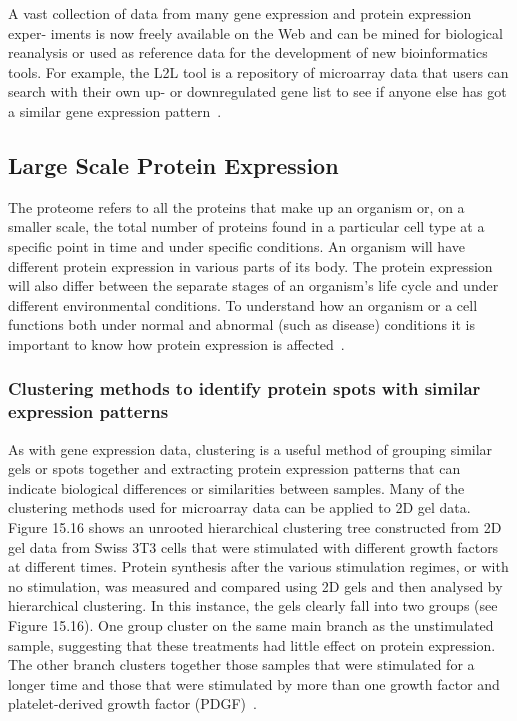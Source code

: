 \documentclass{report}
\begin{document}
A vast collection of data from many gene expression and protein expression exper- iments is now freely available on the Web and can be mined for biological reanalysis or used as reference data for the development of new bioinformatics tools. For example, the L2L tool is a repository of microarray data that users can search with their own up- or downregulated gene list to see if anyone else has got a similar gene expression pattern~\cite{zvelebil_understanding_2008}.

\subsection{Large Scale Protein Expression}

The proteome refers to all the proteins that make up an organism or, on a smaller scale, the total number of proteins found in a particular cell type at a specific point in time and under specific conditions. An organism will have different protein expression in various parts of its body. The protein expression will also differ between the separate stages of an organism’s life cycle and under different environmental conditions. To understand how an organism or a cell functions both under normal and abnormal (such as disease) conditions it is important to know how protein expression is affected~\cite{zvelebil_understanding_2008}.

\subsubsection{Clustering methods to identify protein spots with similar expression patterns}

As with gene expression data, clustering is a useful method of grouping similar gels or spots together and extracting protein expression patterns that can indicate biological differences or similarities between samples. Many of the clustering methods used for microarray data can be applied to 2D gel data. Figure 15.16 shows an unrooted hierarchical clustering tree constructed from 2D gel data from Swiss 3T3 cells that were stimulated with different growth factors at different times. Protein synthesis after the various stimulation regimes, or with no stimulation, was measured and compared using 2D gels and then analysed by hierarchical clustering. In this instance, the gels clearly fall into two groups (see Figure 15.16). One group cluster on the same main branch as the unstimulated sample, suggesting that these treatments had little effect on protein expression. The other branch clusters together those samples that were stimulated for a longer time and those that were stimulated by more than one growth factor and platelet-derived growth factor (PDGF)~\cite{zvelebil_understanding_2008}.
\end{document}
